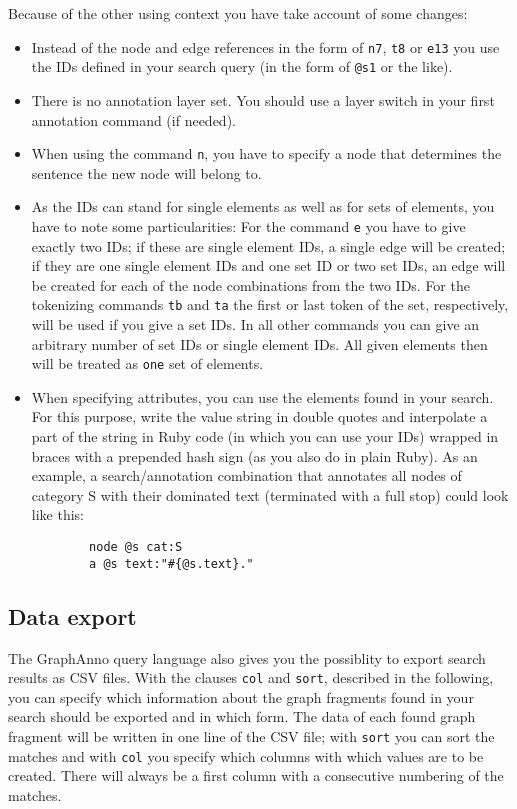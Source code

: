 \documentclass[12pt]{scrartcl}
\begin{document}
Because of the other using context you have take account of some changes:
\begin{itemize}
	\item Instead of the node and edge references in the form of \texttt{n7}, \texttt{t8} or \texttt{e13} you use the IDs defined in your search query (in the form of \texttt{@s1} or the like).
	\item There is no annotation layer set. You should use a layer switch in your first annotation command (if needed).
	\item When using the command \texttt{n}, you have to specify a node that determines the sentence the new node will belong to.
	\item As the IDs can stand for single elements as well as for sets of elements, you have to note some particularities: For the command \texttt{e} you have to give exactly two IDs; if these are single element IDs, a single edge will be created; if they are one single element IDs and one set ID or two set IDs, an edge will be created for each of the node combinations from the two IDs. For the tokenizing commands \texttt{tb} and \texttt{ta} the first or last token of the set, respectively, will be used if you give a set IDs. In all other commands you can give an arbitrary number of set IDs or single element IDs. All given elements then will be treated as \texttt{one} set of elements.
	\item When specifying attributes, you can use the elements found in your search. For this purpose, write the value string in double quotes and interpolate a part of the string in Ruby code (in which you can use your IDs) wrapped in braces with a prepended hash sign (as you also do in plain Ruby). As an example, a search/annotation combination that annotates all nodes of category S with their dominated text (terminated with a full stop) could look like this:
	\begin{verbatim}
		node @s cat:S
		a @s text:"#{@s.text}."
	\end{verbatim}
\end{itemize}



\subsection{Data export}

The GraphAnno query language also gives you the possiblity to export search results as CSV files.
With the clauses \texttt{col} and \texttt{sort}, described in the following, you can specify which information about the graph fragments found in your search should be exported and in which form.
The data of each found graph fragment will be written in one line of the CSV file; with \texttt{sort} you can sort the matches and with \texttt{col} you specify which columns with which values are to be created.
There will always be a first column with a consecutive numbering of the matches.
\end{document}
